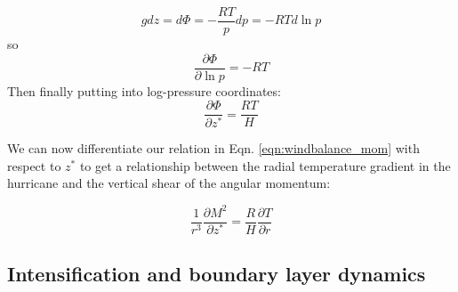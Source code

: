 \begin{equation*}
    gdz = d\Phi=-\frac{RT}{p}dp=-RTd\ln p
\end{equation*}
so
\begin{equation*}
    \frac{\partial\Phi}{\partial \ln p}=-RT
\end{equation*}
Then finally putting into log-pressure coordinates:
\begin{equation*}
    \frac{\partial \Phi}{\partial z^*}=\frac{RT}{H}
\end{equation*}

We can now differentiate our relation in Eqn. \ref{eqn:windbalance_mom} with respect to $z^*$ to get a relationship between the radial temperature gradient in the hurricane and the vertical shear of the angular momentum:

\begin{equation}
    \frac{1}{r^3}\frac{\partial M^2}{\partial z^*}=\frac{R}{H}\frac{\partial T}{\partial r}
\end{equation}


\subsection{Intensification and boundary layer dynamics}

